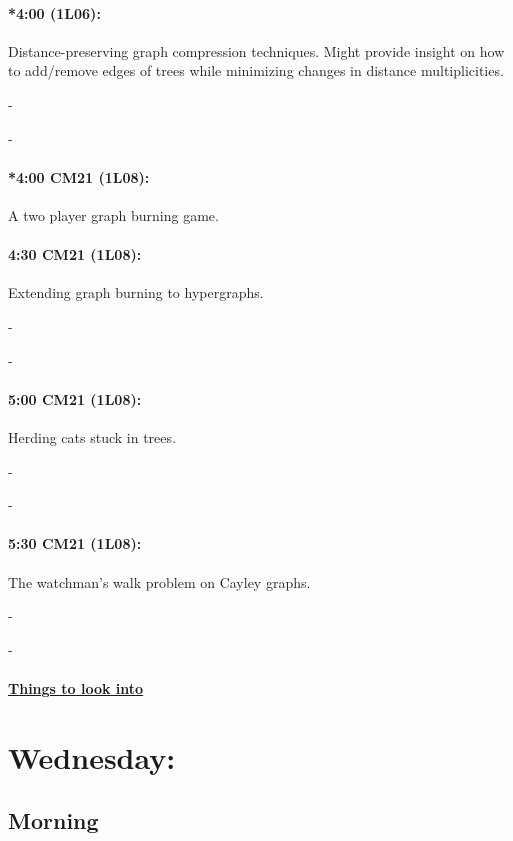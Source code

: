 \documentclass[12]{article}
\theoremstyle{definition}
\begin{document}
	\paragraph{*4:00 (1L06):} Distance-preserving graph compression techniques.
	Might provide insight on how to add/remove edges of trees while minimizing changes in distance multiplicities.
	
	-
	
	-
	
	\paragraph{*4:00 CM21 (1L08):} A two player graph burning game.
	
	\paragraph{4:30 CM21 (1L08):} Extending graph burning to hypergraphs.
	
	-
	
	-
	
	\paragraph{5:00 CM21 (1L08):} Herding cats stuck in trees.
	
	-
	
	-
	
	\paragraph{5:30 CM21 (1L08):} The watchman's walk problem on Cayley graphs.
	
	-
	
	-
	
	\begin{center} 
		\item\paragraph{\underline{Things to look into}} 
	\end{center}

	
	\newpage
	\section{Wednesday:}
	\subsection{Morning}
	
\end{document}
